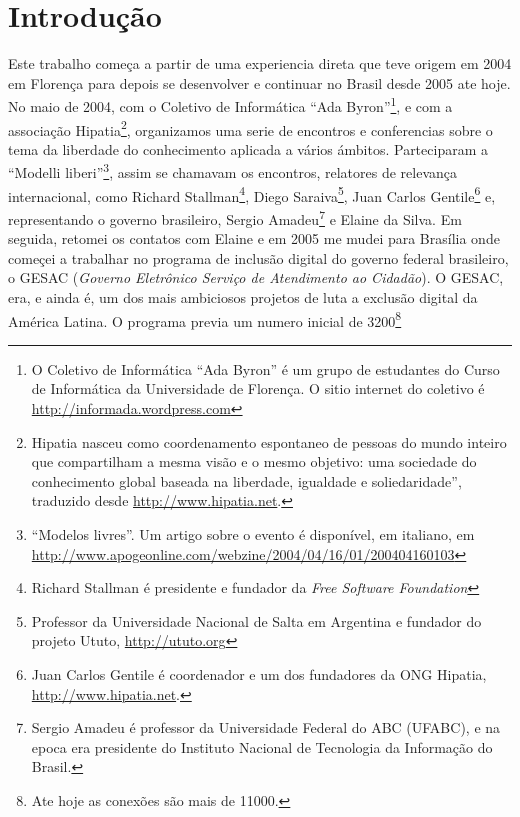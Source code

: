 
\chapter{Introdução}
\label{Capitulo1}


Este trabalho começa a partir de uma experiencia direta que teve
origem em 2004 em Florença para depois se desenvolver e continuar no
Brasil desde 2005 ate hoje. No maio de 2004, com o Coletivo de
Informática ``Ada Byron''\footnote{O Coletivo de Informática ``Ada
  Byron'' é um grupo de estudantes do Curso de Informática da
  Universidade de Florença. O sitio internet do coletivo é
  \url{http://informada.wordpress.com}}, e com a associação
Hipatia\footnote{Hipatia nasceu como coordenamento espontaneo de
  pessoas do mundo inteiro que compartilham a mesma visão e o mesmo
  objetivo: uma sociedade do conhecimento global baseada na liberdade,
  igualdade e soliedaridade'', traduzido desde
  \url{http://www.hipatia.net}.}, organizamos uma serie de encontros e
conferencias sobre o tema da liberdade do conhecimento aplicada a
vários ámbitos. Parteciparam a ``Modelli liberi''\footnote{``Modelos
  livres''. Um artigo sobre o evento é disponível, em italiano, em
  \url{http://www.apogeonline.com/webzine/2004/04/16/01/200404160103}},
assim se chamavam os encontros, relatores de relevança internacional,
como Richard Stallman\footnote{Richard Stallman é presidente e
  fundador da \emph{Free Software Foundation}}, Diego
Saraiva\footnote{Professor da Universidade Nacional de Salta em
  Argentina e fundador do projeto Ututo, \url{http://ututo.org}}, Juan
Carlos Gentile\footnote{Juan Carlos Gentile é coordenador e um dos
  fundadores da ONG Hipatia, \url{http://www.hipatia.net}.} e,
representando o governo brasileiro, Sergio Amadeu\footnote{Sergio
  Amadeu é professor da Universidade Federal do ABC (UFABC), e na
  epoca era presidente do Instituto Nacional de Tecnologia da
  Informação do Brasil.} e Elaine da Silva. Em seguida, retomei os contatos com
Elaine e em 2005 me mudei para Brasília onde começei a trabalhar no
programa de inclusão digital do governo federal brasileiro, o GESAC
(\emph{Governo Eletrônico Serviço de Atendimento ao Cidadão}). O
GESAC, era, e ainda é, um dos mais ambiciosos projetos de luta a
exclusão digital da América Latina. O programa previa um numero
inicial de 3200\footnote{Ate hoje as conexões são mais de 11000.}
